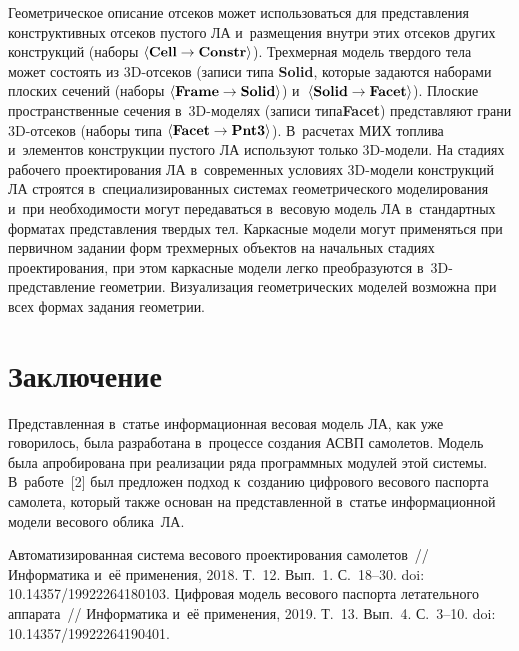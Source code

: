 \begin{multicols}{2}
Гео\-мет\-ри\-че\-ское описание отсеков может использоваться для представления 
конструктивных отсеков пустого ЛА и~размещения внутри этих отсеков других 
конструкций (наборы 
$\langle \mbox{\textbf{Cell}}\hm \to \mbox{\textbf{Constr}}\rangle$).  
Трехмерная мо\-дель твердого тела может состоять из 3D-от\-се\-ков (записи типа 
\textbf{Solid}, которые задаются наборами плоских сечений (наборы 
$\langle \mbox{\textbf{Frame}}\hm \to \mbox{\textbf{Solid}}\rangle$) 
и~$\langle \mbox{\textbf{Solid}}\hm \to \mbox{\textbf{Facet}}\rangle$). Плоские 
пространственные сечения  
в~3D-мо\-де\-лях (записи типа\linebreak \textbf{Facet}) представляют грани  
3D-от\-се\-ков (наборы типа 
$\langle \mbox{\textbf{Facet}}\hm\to \mbox{\textbf{Pnt3}}\rangle$). 
В~расчетах МИХ топлива и~элементов 
конструкции пустого ЛА используют только  
3D-мо\-де\-ли. На стадиях рабочего проектирования ЛА в~современных 
условиях 3D-мо\-де\-ли конструкций ЛА строятся в~специализированных 
системах геометрического моделирования и~при необходимости могут 
передаваться в~весовую модель ЛА в~стандартных форматах представления 
твердых тел. Каркасные модели могут применяться при первичном задании 
форм трехмерных объектов на начальных стадиях проектирования, при этом 
каркасные модели легко преобразуются  
в~3D-пред\-став\-ле\-ние гео\-мет\-рии. Визуализация геометрических моделей 
возможна при всех формах задания геометрии.

\section{Заключение}

  Представленная в~статье информационная весовая модель ЛА, как уже 
говорилось, была
 разработана в~процессе создания АСВП самолетов. Модель была апробирована при 
реализации ряда программных модулей этой системы. В~работе~[2] был 
предложен подход к~созданию цифрового весового паспорта самолета, который 
также основан на представленной в~статье информационной модели весового 
облика~ЛА.
  
{\small\frenchspacing
{%
\begin{thebibliography}{9}
 Автоматизированная система 
весового проектирования самолетов~// Информатика и~её применения, 2018. Т.~12. Вып.~1. 
С.~18--30. doi: 10.14357/19922264180103.
 Циф\-ро\-вая модель весового 
паспорта летательного аппарата~// Информатика и~её применения, 2019. Т.~13. Вып.~4. 
С.~3--10. doi: 10.14357/19922264190401.
 \end{thebibliography}

}
}

\end{multicols}

